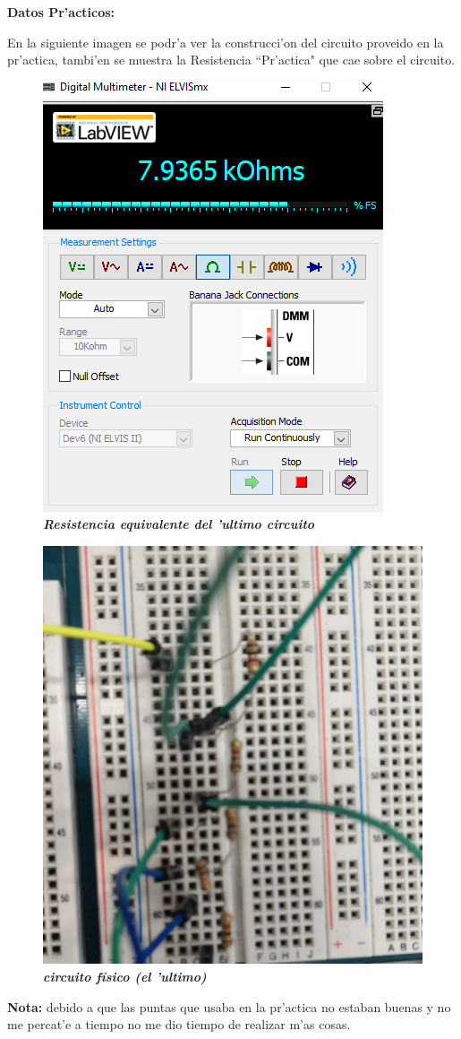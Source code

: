 \documentclass[11pt, letterpaper]{report}
\newenvironment{block}[1]{\hspace{-0.8 cm}\textbf{\Large #1}}{\vspace{3 mm}} %
\newcommand{\note}[1]{\small \textbf{Nota:} #1} %
\begin{document}
	\begin{block}{Datos Pr'acticos:}
	
	En la siguiente imagen se podr'a ver la construcci'on del circuito proveido en la pr'actica, tambi'en se muestra la Resistencia ``Pr'actica" que cae sobre el circuito.
	
	\begin{figure}[H]
	\hfill\includegraphics[width=.32\textwidth]{image.png}\hspace*{\fill}
	\caption{\textbf{\emph{Resistencia equivalente del 'ultimo circuito}}}
	\end{figure}
	
	\begin{figure}[H]
	\hfill\includegraphics[width=.32\textwidth]{circ.jpg} \hspace*{\fill}
	\caption{\textbf{\emph{circuito físico (el 'ultimo)}}}
	\end{figure}
	
	\note{debido a que las puntas que usaba en la pr'actica no estaban buenas y no me percat'e a tiempo no me dio tiempo de realizar m'as cosas.}
	
	\end{block}
	
\end{document}
